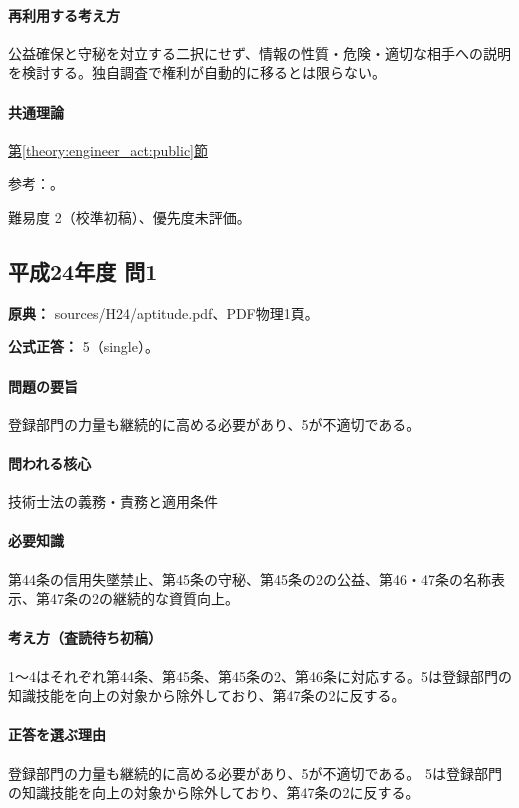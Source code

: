 \paragraph{再利用する考え方} 公益確保と守秘を対立する二択にせず、情報の性質・危険・適切な相手への説明を検討する。独自調査で権利が自動的に移るとは限らない。

\paragraph{共通理論} \hyperref[theory:engineer_act:public]{第\ref*{theory:engineer_act:public}節}

\par 参考：\cite{engineer_act_current,cpd_v3}。

\par 難易度 2（校準初稿）、優先度未評価。

\subsection{平成24年度 問1}
\label{q:h24-reg-apt-01}

\noindent\textbf{原典：} sources/H24/aptitude.pdf、PDF物理1頁。

\textbf{公式正答：} 5（single）。

\paragraph{問題の要旨} 登録部門の力量も継続的に高める必要があり、5が不適切である。

\paragraph{問われる核心} 技術士法の義務・責務と適用条件

\paragraph{必要知識} 第44条の信用失墜禁止、第45条の守秘、第45条の2の公益、第46・47条の名称表示、第47条の2の継続的な資質向上。

\paragraph{考え方（査読待ち初稿）} 1～4はそれぞれ第44条、第45条、第45条の2、第46条に対応する。5は登録部門の知識技能を向上の対象から除外しており、第47条の2に反する。

\paragraph{正答を選ぶ理由} 登録部門の力量も継続的に高める必要があり、5が不適切である。 5は登録部門の知識技能を向上の対象から除外しており、第47条の2に反する。

